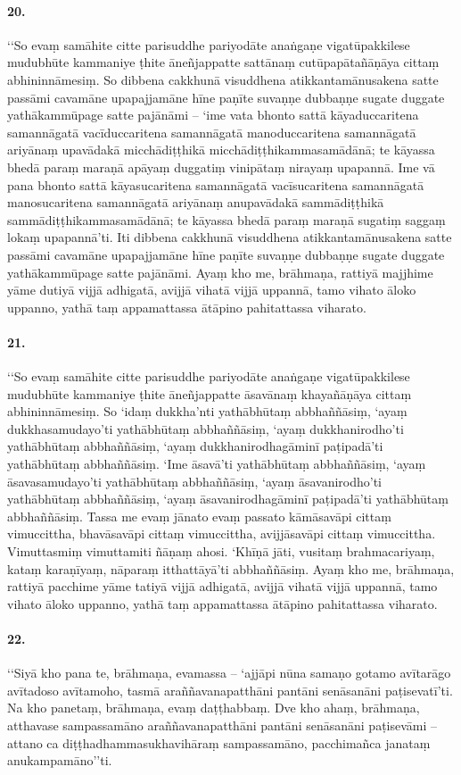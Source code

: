 \paragraph{20.} ‘‘So evaṃ samāhite citte parisuddhe pariyodāte anaṅgaṇe vigatūpakkilese mudubhūte kammaniye ṭhite āneñjappatte sattānaṃ cutūpapātañāṇāya cittaṃ abhininnāmesiṃ. So dibbena cakkhunā visuddhena atikkantamānusakena satte passāmi cavamāne upapajjamāne hīne paṇīte suvaṇṇe dubbaṇṇe sugate duggate yathākammūpage satte pajānāmi – ‘ime vata bhonto sattā kāyaduccaritena samannāgatā vacīduccaritena samannāgatā manoduccaritena samannāgatā ariyānaṃ upavādakā micchādiṭṭhikā micchādiṭṭhikammasamādānā; te kāyassa bhedā paraṃ maraṇā apāyaṃ duggatiṃ vinipātaṃ nirayaṃ upapannā. Ime vā pana bhonto sattā kāyasucaritena samannāgatā vacīsucaritena samannāgatā manosucaritena samannāgatā ariyānaṃ anupavādakā sammādiṭṭhikā sammādiṭṭhikammasamādānā; te kāyassa bhedā paraṃ maraṇā sugatiṃ saggaṃ lokaṃ upapannā’ti. Iti dibbena cakkhunā visuddhena atikkantamānusakena satte passāmi cavamāne upapajjamāne hīne paṇīte suvaṇṇe dubbaṇṇe sugate duggate yathākammūpage satte pajānāmi. Ayaṃ kho me, brāhmaṇa, rattiyā majjhime yāme dutiyā vijjā adhigatā, avijjā vihatā vijjā uppannā, tamo vihato āloko uppanno, yathā taṃ appamattassa ātāpino pahitattassa viharato.

\paragraph{21.} ‘‘So evaṃ samāhite citte parisuddhe pariyodāte anaṅgaṇe vigatūpakkilese mudubhūte kammaniye ṭhite āneñjappatte āsavānaṃ khayañāṇāya cittaṃ abhininnāmesiṃ. So ‘idaṃ dukkha’nti yathābhūtaṃ abbhaññāsiṃ, ‘ayaṃ dukkhasamudayo’ti yathābhūtaṃ abbhaññāsiṃ, ‘ayaṃ dukkhanirodho’ti yathābhūtaṃ abbhaññāsiṃ, ‘ayaṃ dukkhanirodhagāminī paṭipadā’ti yathābhūtaṃ abbhaññāsiṃ. ‘Ime āsavā’ti yathābhūtaṃ abbhaññāsiṃ, ‘ayaṃ āsavasamudayo’ti yathābhūtaṃ abbhaññāsiṃ, ‘ayaṃ āsavanirodho’ti yathābhūtaṃ abbhaññāsiṃ, ‘ayaṃ āsavanirodhagāminī paṭipadā’ti yathābhūtaṃ abbhaññāsiṃ. Tassa me evaṃ jānato evaṃ passato kāmāsavāpi cittaṃ vimuccittha, bhavāsavāpi cittaṃ vimuccittha, avijjāsavāpi cittaṃ vimuccittha. Vimuttasmiṃ vimuttamiti ñāṇaṃ ahosi. ‘Khīṇā jāti, vusitaṃ brahmacariyaṃ, kataṃ karaṇīyaṃ, nāparaṃ itthattāyā’ti abbhaññāsiṃ. Ayaṃ kho me, brāhmaṇa, rattiyā pacchime yāme tatiyā vijjā adhigatā, avijjā vihatā vijjā uppannā, tamo vihato āloko uppanno, yathā taṃ appamattassa ātāpino pahitattassa viharato.

\paragraph{22.} ‘‘Siyā kho pana te, brāhmaṇa, evamassa – ‘ajjāpi nūna samaṇo gotamo avītarāgo avītadoso avītamoho, tasmā araññavanapatthāni pantāni senāsanāni paṭisevatī’ti. Na kho panetaṃ, brāhmaṇa, evaṃ daṭṭhabbaṃ. Dve kho ahaṃ, brāhmaṇa, atthavase sampassamāno araññavanapatthāni pantāni senāsanāni paṭisevāmi – attano ca diṭṭhadhammasukhavihāraṃ sampassamāno, pacchimañca janataṃ anukampamāno’’ti.

